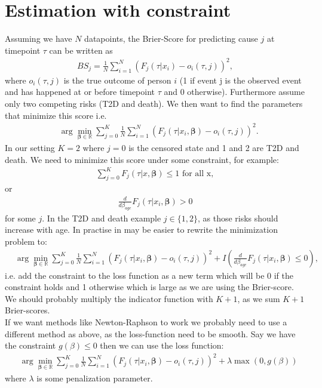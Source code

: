 \documentclass{article}
\begin{document}
\section*{Estimation with constraint}
\label{sec:org8c7c6ca}

Assuming we have \(N\) datapoints, the Brier-Score for predicting cause \(j\) at timepoint \(\tau\) can be written as
\begin{align*}
BS_j = \frac{1}{N}\sum_{i = 1}^N(F_j(\tau|x_i)-o_i(\tau,j))^2,
\end{align*}
where \(o_i(\tau,j)\) is the true outcome of person \(i\) (1 if event j is the observed event and has happened at or before timepoint \(\tau\) and 0 otherwise). Furthermore assume only two competing risks (T2D and death). We then want to find the parameters that minimize this score i.e.
\begin{align*}
&\arg\min_{\boldsymbol{\beta}\in\mathbb{R}}\sum_{j = 0}^K\frac{1}{N}\sum_{i = 1}^N(F_j(\tau|x_i,\boldsymbol{\beta})-o_i(\tau,j))^2.
\end{align*}
In our setting \(K = 2\) where \(j = 0\) is the censored state and 1 and 2 are T2D and death. We need to minimize this score under some constraint, for example:
\begin{align*}
\sum_{j = 0}^K F_j(\tau|x,\boldsymbol{\beta})\leq 1 \text{ for all x},
\end{align*}
or
\begin{align*}
\frac{d}{d\beta_{age}}F_j(\tau|x_i,\boldsymbol{\beta})>0
\end{align*}
for some \(j\). In the T2D and death example \(j\in\{1,2\}\), as those risks should increase with age. In practise in may be easier to rewrite the minimization problem to:
\begin{align*}
&\arg\min_{\boldsymbol{\beta}\in\mathbb{R}}\sum_{j = 0}^K\frac{1}{N}\sum_{i = 1}^N(F_j(\tau|x_i,\boldsymbol{\beta})-o_i(\tau,j))^2+ I\left(\frac{d}{d\beta_{age}}F_j(\tau|x_i,\boldsymbol{\beta})\leq0\right),
\end{align*}
i.e. add the constraint to the loss function as a new term which will be 0 if the constraint holds and 1 otherwise which is large as we are using the Brier-score. We should probably multiply the indicator function with \(K+1\), as we sum \(K+1\) Brier-scores. \\[0pt]
If we want methods like Newton-Raphson to work we probably need to use a different method as above, as the loss-function need to be smooth. Say we have the constraint \(g(\beta)\leq 0\) then we can use the loss function:
\begin{align*}
&\arg\min_{\boldsymbol{\beta}\in\mathbb{R}}\sum_{j = 0}^K\frac{1}{N}\sum_{i = 1}^N(F_j(\tau|x_i,\boldsymbol{\beta})-o_i(\tau,j))^2+\lambda\max(0,g(\beta))
\end{align*}
where \(\lambda\) is some penalization parameter. 
\end{document}
